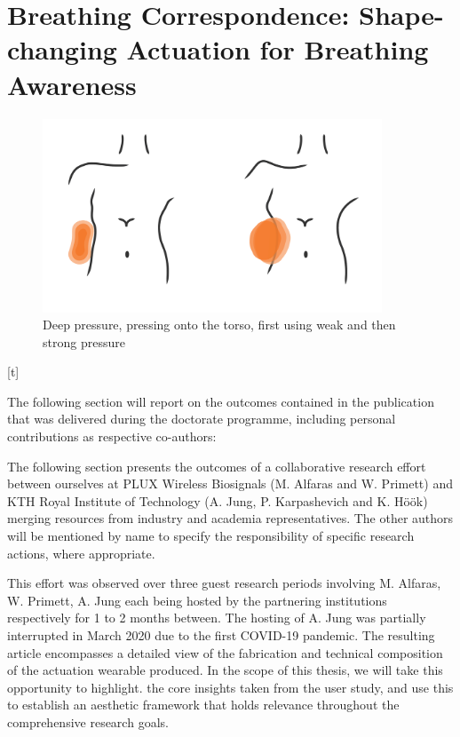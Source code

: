 
\section{Breathing Correspondence: Shape-changing Actuation for Breathing Awareness}

\begin{figure}[t]
  \centering  
  \includegraphics[width=0.9\textwidth]{Chapters/Figures/soma_chi/deep_pressure_graphic-01.png}
  \caption{Deep pressure, pressing onto the torso, first using weak and then strong pressure}
  \label{fig:teaser}
\end{figure}[t]

The following section will report on the outcomes contained in the publication that was delivered during the doctorate programme, including personal contributions as respective co-authors: 


The following section presents the outcomes of a collaborative research effort between ourselves at PLUX Wireless Biosignals (M. Alfaras and W. Primett) and KTH Royal Institute of Technology (A. Jung, P. Karpashevich and K. Höök) merging resources from industry and academia representatives. The other authors will be mentioned by name to specify the responsibility of specific research actions, where appropriate.

This effort was observed over three guest research periods involving M. Alfaras, W. Primett, A. Jung each being hosted by the partnering institutions respectively for 1 to 2 months between. The hosting of A. Jung was partially interrupted in March 2020 due to the first COVID-19 pandemic. The resulting article encompasses a detailed view of the fabrication and technical composition of the actuation wearable produced. In the scope of this thesis, we will take this opportunity to highlight. the core insights taken from the user study, and use this to establish an aesthetic framework that holds relevance throughout the comprehensive research goals.

